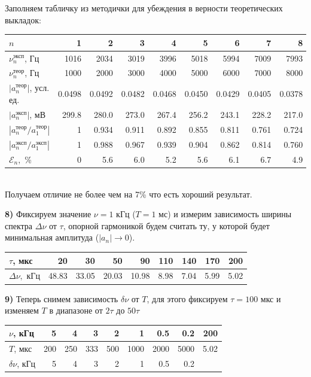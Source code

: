 \documentclass[a4paper,12pt]{extarticle}
\begin{document}
Заполняем табличку из методички для убеждения в верности теоретических выкладок:
\begin{tabular}{|l|r|r|r|r|r|r|r|r|}
\hline
$n$ & 1      & 2      & 3      & 4      & 5      & 6      & 7      & 8      \\ \hline
 $\nu_n^{\text{эксп}}$, Гц & 1016   & 2034   & 3019   & 3996   & 5018   & 5994   & 7009   & 7993   \\ \hline
 $\nu_n^{\text{теор}}$, Гц & 1000   & 2000   & 3000   & 4000   & 5000   & 6000   & 7000   & 8000   \\ \hline
 $|a_n^{\text{теор}}|$, усл. ед. & 0.0498 & 0.0492 & 0.0482 & 0.0468 & 0.0450 & 0.0429 & 0.0405 & 0.0378 \\ \hline
 $|a_n^{\text{эксп}}|$, мВ & 299.8  & 280.0  & 273.0  & 267.4  & 256.2  & 243.1  & 228.2  & 217.0  \\ \hline
 $|a_n^{\text{теор}}/a_1^{\text{теор}}|$ & 1      & 0.934  & 0.911  & 0.892  & 0.855  & 0.811  & 0.761  & 0.724  \\ \hline
 $|a_n^{\text{эксп}} / a_1^{\text{эксп}}|$ & 1      & 0.988  & 0.967  & 0.939  & 0.904  & 0.862  & 0.814  & 0.760  \\ \hline
 $\mathcal{E}_n,$ \% & 0 & 5.6    & 6.0    & 5.2    & 5.6    & 6.1    & 6.7    & 4.9    \\ \hline
\end{tabular} \\
Получаем отличие не более чем на 7\% что есть хороший результат.

\indent \textbf{8)} Фиксируем значение $\nu = 1$ кГц ($T = 1$ мс) и измерим зависимость ширины спектра $\Delta \nu$ от $\tau$, опорной гармоникой будем считать ту, у которой будет минимальная амплитуда ($|a_n| \rightarrow 0$).

\begin{tabular}{|l|r|r|r|r|r|r|r|r|}
\hline
$\tau$, мкс & 20    & 30    & 50    & 90    & 110  & 140  & 170  & 200  \\ \hline
$\Delta \nu,$ кГц & 48.83 & 33.05 & 20.03 & 10.98 & 8.98 & 7.04 & 5.99 & 5.02 \\ \hline
\end{tabular}

\indent \textbf{9)} Теперь снимем зависимость $\delta \nu$ от $T$, для этого фиксируем $\tau = 100$ мкс и изменяем $T$ в диапазоне от $2\tau$ до $50\tau$

\begin{tabular}{|l|r|r|r|r|r|r|r|r|}
\hline
$\nu$, кГц & 5   & 4   & 3   & 2   & 1    & 0.5  & 0.2  & 200                   \\ \hline
$T$, мкс & 200 & 250 & 333 & 500 & 1000 & 2000 & 5000 & 5.02                  \\ \hline
$\delta \nu$, кГц & 5   & 4   & 3   & 2   & 1    & 0.5  & 0.2  & \multicolumn{1}{l|}{} \\ \hline
\end{tabular}
\end{document}
